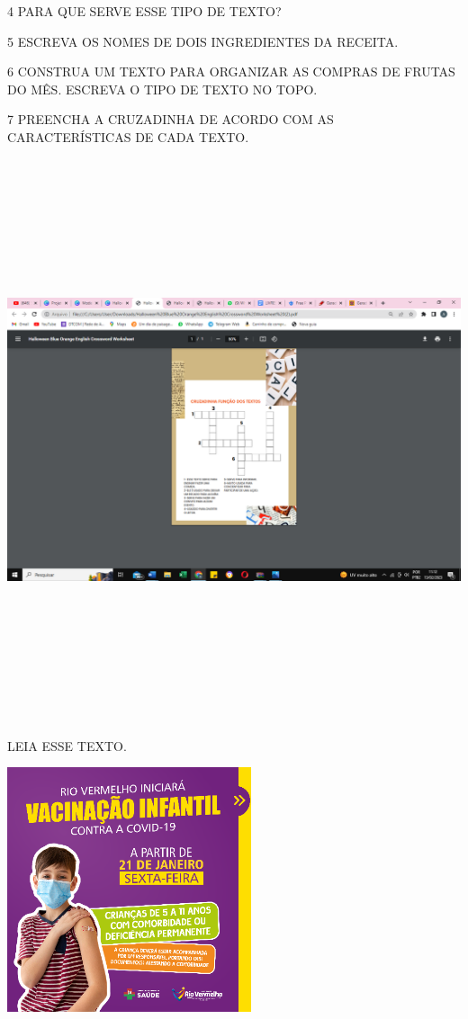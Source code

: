 \num{4} PARA QUE SERVE ESSE TIPO DE TEXTO?


\num{5} ESCREVA OS NOMES DE DOIS INGREDIENTES DA RECEITA.


\num{6} CONSTRUA UM TEXTO PARA ORGANIZAR AS COMPRAS DE FRUTAS DO MÊS. ESCREVA O TIPO DE TEXTO NO TOPO.


\num{7} PREENCHA A CRUZADINHA DE ACORDO COM AS CARACTERÍSTICAS DE CADA TEXTO.

\includegraphics[width=5.80417in,height=6.50556in]{media/image155.png}


LEIA ESSE TEXTO.

\includegraphics[width=2.82569in,height=2.82569in]{media/image156.png}


